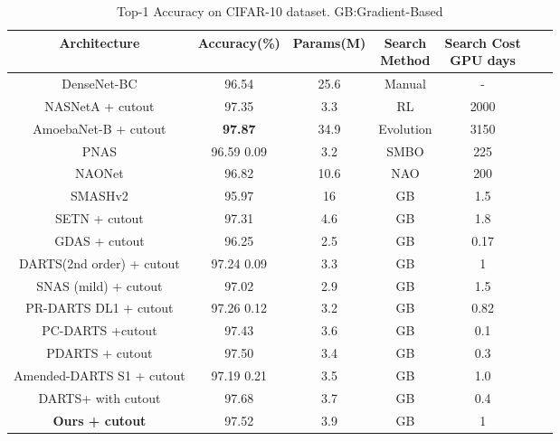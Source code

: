\documentclass[10pt,a4paper,conference]{IEEEtran}
\begin{document}
\begin{table*}[tbp]
    \centering
    \begin{tabular}{c|c|c|c|ccc}
    \toprule
    Architecture & Accuracy(\%) & Params(M) & \makecell{Search \\ Method} & \makecell{Search Cost \\ GPU days}\\
    \midrule
   DenseNet-BC \cite{huang2017densely:25} & 96.54 & 25.6 & Manual & -\\
   \hline
NASNetA + cutout \cite{zoph2018learning:1} & 97.35 & 3.3 & RL & 2000\\
AmoebaNet-B + cutout \cite{RealAggarwalHuangLe2018:5} & \textbf{97.87} & 34.9 & Evolution & 3150\\
PNAS \cite{Liu_2018:4} & 96.59  0.09 & 3.2 & SMBO & 225\\
NAONet \cite{luo2018neural:9}  & 96.82 & 10.6 & NAO & 200\\
\hline
SMASHv2 \cite{brock2017smash:10} & 95.97 & 16 & GB & 1.5 \\
SETN + cutout \cite{dong2019one:12} & 97.31 & 4.6 & GB & 1.8\\
GDAS + cutout \cite{dong2019searching:13}  & 96.25 & 2.5 & GB & 0.17\\
DARTS(2nd order) + cutout \cite{liu2018darts:6} & 97.24  0.09 & 3.3 & GB & 1\\
SNAS (mild) + cutout \cite{xie2018snas:4}& 97.02 & 2.9 & GB & 1.5\\
PR-DARTS DL1 + cutout \cite{laube2019prune:14} & 97.26  0.12 & 3.2 & GB & 0.82\\
PC-DARTS +cutout \cite{xu2019pc:17} & 97.43  & 3.6 & GB & 0.1\\
PDARTS + cutout \cite{chen2019progressive:18} & 97.50  & 3.4 & GB & 0.3\\
Amended-DARTS S1 + cutout \cite{bi2019stabilizing:16} & 97.19  0.21 & 3.5 & GB & 1.0 \\
DARTS+ with cutout \cite{liang2019darts+:19}   & 97.68 & 3.7 & GB & 0.4 \\
\hline
\textbf{Ours + cutout}  & 97.52 & 3.9 & GB & 1 \\
    \bottomrule
    \end{tabular}
    \caption{Top-1 Accuracy on CIFAR-10 dataset. GB:Gradient-Based}
    \label{tab:cifar10}
\end{table*}
\end{document}
